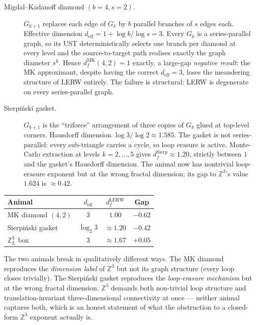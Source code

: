\documentclass[10pt,a4paper,twocolumn]{article}
\theoremstyle{plain}
\theoremstyle{definition}
\begin{document}
\begin{description}
\item[Migdal--Kadanoff diamond $(b=4, s=2)$.]  $G_{k+1}$ replaces
  each edge of $G_k$ by $b$ parallel branches of $s$ edges each.
  Effective dimension $d_{\text{eff}} = 1 + \log b/\log s = 3$.
  Every $G_k$ is a series-parallel graph, so its UST
  deterministically selects one branch per diamond at every level
  and the source-to-target path realises exactly the graph
  diameter $s^k$.  Hence $d_f^{\text{MK}}(4, 2) = 1$ exactly, a
  large-gap \emph{negative result}: the MK approximant, despite
  having the correct $d_{\text{eff}} = 3$, loses the meandering
  structure of LERW entirely.  The failure is structural: LERW is
  degenerate on every series-parallel graph.

\item[Sierpi\'nski gasket.]  $G_{k+1}$ is the ``triforce''
  arrangement of three copies of $G_k$ glued at top-level corners.
  Hausdorff dimension $\log 3 / \log 2 \approx 1.585$.  The gasket
  is not series-parallel: every sub-triangle carries a cycle, so
  loop erasure is active.  Monte-Carlo extraction at levels
  $k = 2, \dots, 5$ gives $d_f^{\text{Sierp}} \approx 1.20$,
  strictly between $1$ and the gasket's Hausdorff dimension.  The
  animal now has nontrivial loop-erasure exponent but at the
  wrong fractal dimension; its gap to $\mathbb{Z}^3$'s value
  $1.624$ is $\approx 0.42$.
\end{description}

\medskip
\noindent
{\small
\begin{tabular}{@{}p{}ccc@{}}
\toprule
Animal & $d_{\text{eff}}$ & $d_f^{\text{LERW}}$ & Gap \\
\midrule
MK diamond $(4, 2)$  & $3$         & $1.00$         & $-0.62$ \\
Sierpi\'nski gasket  & $\log_2 3$  & $\approx 1.20$ & $-0.42$ \\
$\mathbb{Z}^3_L$ box & $3$         & $\approx 1.67$ & $+0.05$ \\
\bottomrule
\end{tabular}
}

\medskip
\noindent The two animals break in qualitatively different ways.
The MK diamond reproduces the \emph{dimension label} of
$\mathbb{Z}^3$ but not its graph structure (every loop closes
trivially).  The Sierpi\'nski gasket reproduces the
\emph{loop-erasure mechanism} but at the wrong fractal dimension.
$\mathbb{Z}^3$ demands both non-trivial loop structure and
translation-invariant three-dimensional connectivity at once ---
neither animal captures both, which is an honest statement of
what the obstruction to a closed-form $\mathbb{Z}^3$ exponent
actually is.
\end{document}

